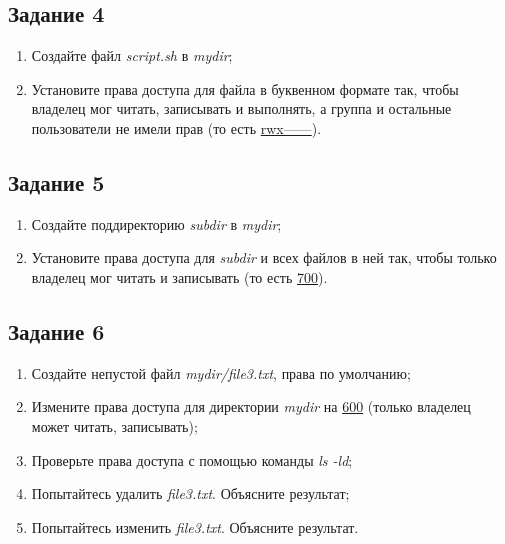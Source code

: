 \documentclass[12pt, a4paper]{report}
\begin{document}
	\subsection*{Задание 4}
	\begin{enumerate}
		\item Создайте файл \textit{script.sh} в \textit{mydir};
		\item Установите права доступа для файла в буквенном формате так, чтобы владелец мог читать, записывать и выполнять, а группа и остальные пользователи не имели прав (то есть \underline{rwx------}).
	\end{enumerate}
	\lstset{style=mystyle}
	

	\subsection*{Задание 5}
	\begin{enumerate}
		\item Создайте поддиректорию \textit{subdir} в \textit{mydir};
		\item Установите права доступа для \textit{subdir} и всех файлов в ней так, чтобы только владелец мог читать и записывать (то есть \underline{700}).
	\end{enumerate}
	\lstset{style=mystyle}
	

	\subsection*{Задание 6}
	\begin{enumerate}
		\item Создайте непустой файл \textit{mydir/file3.txt}, права по умолчанию;
		\item Измените права доступа для директории \textit{mydir} на \underline{600} (только владелец может читать, записывать);
		\item Проверьте права доступа с помощью команды \textit{ls -ld};
		\item Попытайтесь удалить \textit{file3.txt}. Объясните результат;
		\item Попытайтесь изменить \textit{file3.txt}. Объясните результат.
	\end{enumerate}
	\lstset{style=mystyle}
	
\end{document}
